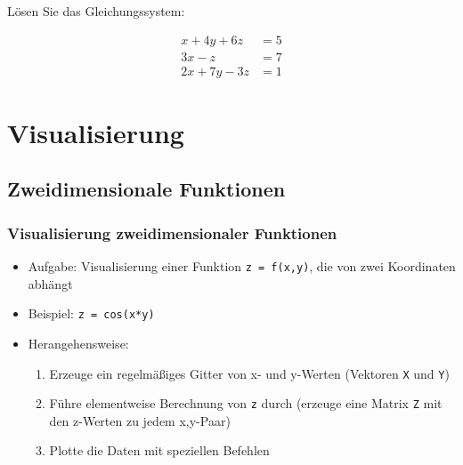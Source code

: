     \secMexercise
    \begin{frame}
        \frameMexercise
        \begin{exercise}
            \sloppy
            Lösen Sie das Gleichungssystem:

            \begin{align*}
                x + 4y + 6z  &= 5 \\
                3x - z &= 7 \\
                2x + 7y -3z &= 1
            \end{align*}

        \end{exercise}
    \end{frame}

    \section{Visualisierung}

    \subsection{Zweidimensionale Funktionen}
    \begin{frame}
        \frametitle{Visualisierung zweidimensionaler Funktionen}
        \begin{itemize}
            \item Aufgabe: Visualisierung einer Funktion \texttt{z = f(x,y)}, die von zwei Koordinaten abhängt
            \item Beispiel: \texttt{z = cos(x*y)}
            \item Herangehensweise:
            \begin{enumerate}
                \item Erzeuge ein regelmäßiges Gitter von x- und y-Werten (Vektoren \texttt{X} und \texttt{Y})
                \item Führe elementweise Berechnung von \texttt{z} durch (erzeuge eine Matrix \texttt{Z} mit den z-Werten zu jedem x,y-Paar)
                \item Plotte die Daten mit speziellen Befehlen
            \end{enumerate}
        \end{itemize}
    \end{frame}

